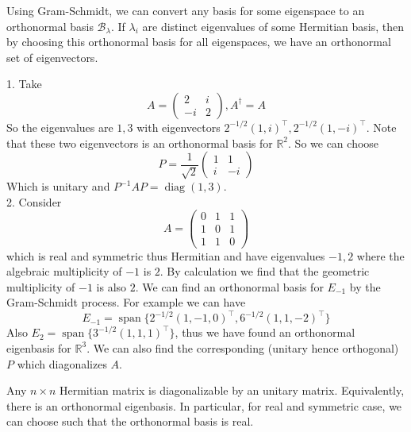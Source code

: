 Using Gram-Schmidt, we can convert any basis for some eigenspace to an orthonormal basis $\mathscr B_\lambda$.
If $\lambda_i$ are distinct eigenvalues of some Hermitian basis, then by choosing this orthonormal basis for all eigenspaces, we have an orthonormal set of eigenvectors.
\begin{example}
    1. Take
    $$A=\begin{pmatrix}
        2&i\\
        -i&2
    \end{pmatrix},A^\dagger=A$$
    So the eigenvalues are $1,3$ with eigenvectors $2^{-1/2}(1,i)^\top,2^{-1/2}(1,-i)^\top$.
    Note that these two eigenvectors is an orthonormal basis for $\mathbb R^2$.
    So we can choose
    $$P=\frac{1}{\sqrt{2}}\begin{pmatrix}
        1&1\\
        i&-i
    \end{pmatrix}$$
    Which is unitary and $P^{-1}AP=\operatorname{diag}(1,3)$.\\
    2. Consider
    $$A=\begin{pmatrix}
        0&1&1\\
        1&0&1\\
        1&1&0
    \end{pmatrix}$$
    which is real and symmetric thus Hermitian and have eigenvalues $-1,2$ where the algebraic multiplicity of $-1$ is $2$.
    By calculation we find that the geometric multiplicity of $-1$ is also $2$.
    We can find an orthonormal basis for $E_{-1}$ by the Gram-Schmidt process.
    For example we can have 
    $$E_{-1}=\operatorname{span}\{2^{-1/2}(1,-1,0)^\top,6^{-1/2}(1,1,-2)^\top\}$$
    Also $E_{2}=\operatorname{span}\{3^{-1/2}(1,1,1)^\top\}$, thus we have found an orthonormal eigenbasis for $\mathbb R^3$.
    We can also find the corresponding (unitary hence orthogonal) $P$ which diagonalizes $A$.
\end{example}
\begin{theorem}
    Any $n\times n$ Hermitian matrix is diagonalizable by an unitary matrix.
    Equivalently, there is an orthonormal eigenbasis.
    In particular, for real and symmetric case, we can choose such that the orthonormal basis is real.
    \label{hermitian_diag}
\end{theorem}
